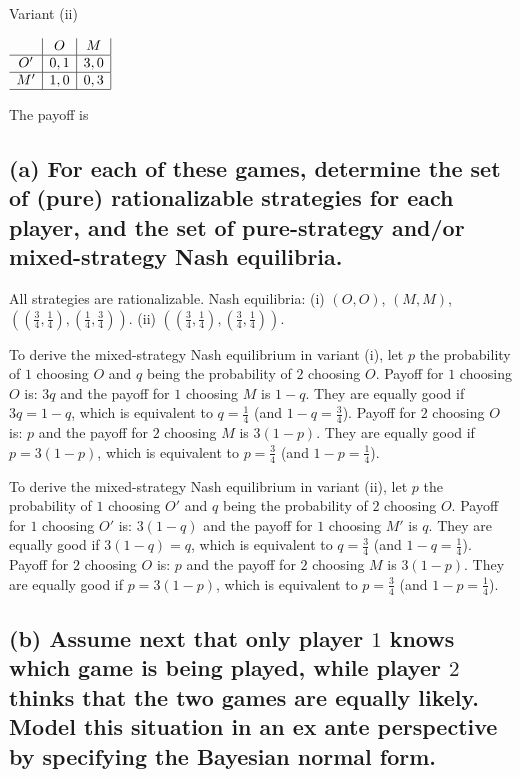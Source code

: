 \documentclass{article}
\begin{document}
\begin{center}
Variant (ii) \vspace{6pt}

$
\begin{array}{c|c|c|}
 & O & M \\
\hline
O' & 0,1 & 3,0 \\
\hline
M' & 1,0 & 0,3 \\
\hline
\end{array}
$
\end{center}

\begin{mdframed}[backgroundcolor=blue!20,linecolor=white]
The payoff is 
\end{mdframed}


%
\subsection*{(a) For each of these games, determine the set of (pure) rationalizable strategies for each
player, and the set of pure-strategy and/or mixed-strategy Nash equilibria.}

All strategies are rationalizable. Nash equilibria: (i) $(O,O)$, $(M,M)$, $\left( \left( \tfrac34, \tfrac14 \right), \left( \tfrac14, \tfrac34 \right) \right)$. (ii) $\left( \left( \tfrac34, \tfrac14 \right), \left( \tfrac34, \tfrac14 \right) \right)$.


To derive the mixed-strategy Nash equilibrium in variant (i), let $p$ the probability of $1$ choosing $O$ and $q$ being the probability of $2$ choosing $O$. Payoff for $1$ choosing $O$ is: $3q$ and the payoff for $1$ choosing $M$ is $1-q$. They are equally good if $3q = 1-q$, which is equivalent to $q = \tfrac14$ (and $1-q=\tfrac34$). Payoff for $2$ choosing $O$ is: $p$ and the payoff for $2$ choosing $M$ is $3(1-p)$. They are equally good if $p = 3(1-p)$, which is equivalent to $p = \tfrac34$ (and $1-p=\tfrac14$).


To derive the mixed-strategy Nash equilibrium in variant (ii), let $p$ the probability of $1$ choosing $O'$ and $q$ being the probability of $2$ choosing $O$. Payoff for $1$ choosing $O'$ is: $3(1-q)$ and the payoff for $1$ choosing $M'$ is $q$. They are equally good if $3(1-q) = q$, which is equivalent to $q = \tfrac34$ (and $1-q=\tfrac14$). Payoff for $2$ choosing $O$ is: $p$ and the payoff for $2$ choosing $M$ is $3(1-p)$. They are equally good if $p = 3(1-p)$, which is equivalent to $p = \tfrac34$ (and $1-p=\tfrac14$).

%
\subsection*{(b) Assume next that only player $1$ knows which game is being played, while player $2$ thinks that
the two games are equally likely. Model this situation in an ex ante perspective by specifying
the Bayesian normal form.}
\end{document}
